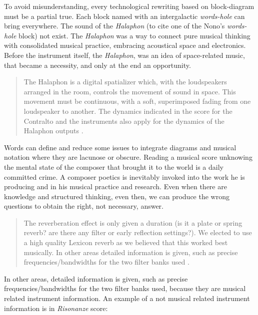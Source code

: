 \documentclass[twoside,a4paper]{article}
\begin{document}
To avoid misunderstanding, every technological rewriting based on block-diagram must be a partial true. Each block named with an intergalactic \emph{words-hole} can bring everywhere. The sound of the \emph{Halaphon} (to cite one of the Nono's \emph{words-hole} block) not exist. The \emph{Halaphon} was a way to connect pure musical thinking with consolidated musical practice, embracing acoustical space and electronics. Before the instrument itself, the \emph{Halaphon}, was an idea of space-related music, that became a necessity, and only at the end an opportunity.

\begin{quote}
The Halaphon is a digital spatializer which, with the loudspeakers arranged in the room, controls the movement of sound in space. This movement must be continuous, with a soft, superimposed fading from one loudspeaker to another. The dynamics indicated in the score for the Contralto and the instruments also apply for the dynamics of the Halaphon outputs \cite{nlre87}. %
\end{quote}

Words can define and reduce some issues to integrate diagrams and musical notation where they are lacunose or obscure. Reading a musical score unknowing the mental state of the composer that brought it to the world is a daily committed crime. A composer poetics is inevitably invoked into the work he is producing and in his musical practice and research. Even when there are knowledge and structured thinking, even then, we can produce the wrong questions to obtain the right, not necessary, answer.  

\begin{quote}
The reverberation effect is only given a duration (is it a plate or spring reverb? are there any filter or early reflection settings?). We elected to use a high quality Lexicon reverb as we believed that this worked best musically. In other areas detailed information is given, such as precise frequencies/bandwidths for the two filter banks used \cite{rw05}.
\end{quote}

In other areas, detailed information is given, such as precise frequencies/bandwidths for the two filter banks used, because they are musical related instrument information. An example of a not musical related instrument information is in \emph{Risonanze} score: 
\end{document}
